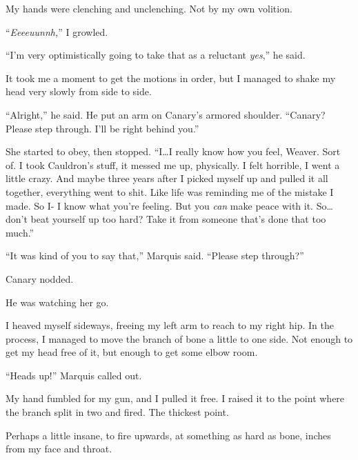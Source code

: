 My hands were clenching and unclenching.  Not by my own volition.



``\emph{Eeeeuunnh,}'' I growled.



``I'm very optimistically going to take that as a reluctant \emph{yes},'' he said.



It took me a moment to get the motions in order, but I managed to shake my head very slowly from side to side.



``Alright,'' he said.  He put an arm on Canary's armored shoulder.  ``Canary?  Please step through.  I'll be right behind you.''



She started to obey, then stopped.  ``I\ldots I really know how you feel, Weaver.  Sort of.  I took Cauldron's stuff, it messed me up, physically.  I felt horrible, I went a little crazy.  And maybe three years after I picked myself up and pulled it all together, everything went to shit.  Like life was reminding me of the mistake I made.  So I- I know what you're feeling.  But you \emph{can} make peace with it.  So\ldots don't beat yourself up too hard?  Take it from someone that's done that too much.''



``It was kind of you to say that,'' Marquis said.  ``Please step through?''



Canary nodded.



He was watching her go.



I heaved myself sideways, freeing my left arm to reach to my right hip.  In the process, I managed to move the branch of bone a little to one side.  Not enough to get my head free of it, but enough to get some elbow room.



``Heads up!'' Marquis called out.



My hand fumbled for my gun, and I pulled it free.  I raised it to the point where the branch split in two and fired.  The thickest point.



Perhaps a little insane, to fire upwards, at something as hard as bone, inches from my face and throat.



